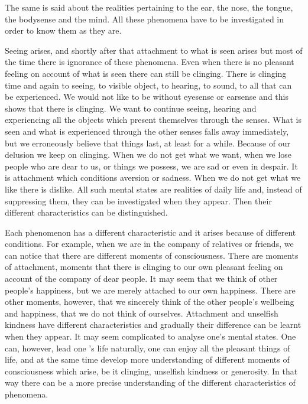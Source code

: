 \documentclass{book}
\begin{document}
The same is said about the realities pertaining to the ear, the nose,
the tongue, the bodysense and the mind. All these phenomena have to be
investigated in order to know them as they are.

Seeing arises, and shortly after that attach­ment to what is
seen arises but most of the time there is ignorance of these phenomena. Even when there is no pleasant feeling on account of what is seen there  can still be clinging. There is clinging time and again to seeing, to
visible object, to hearing, to sound, to all that can be experienced. We
would not like to be without eyesense or earsense and this shows that
there is clinging. We want to continue seeing, hearing and experiencing
all the objects which present themselves through the senses. What is
seen and what is experienced through the other senses falls away
immediately, but we erroneously believe that things last, at least for a
while. Because of our delusion we keep on clinging. When we do not get
what we want, when we lose people who are dear to us, or things we
possess, we are sad or even in despair. It is attachment which
conditions aversion or sadness. When we do not get what we like there is
dislike. All such mental states are realities of daily life and, instead
of suppressing them, they can be investigated when they appear. Then
their different characteristics can be distinguished.

Each phenomenon has a different characteristic and it arises because of
different conditions. For example, when we are in the company of
relatives or friends, we can notice that there are different moments of
consciousness. There are moments of attachment, moments that there is
clinging to our own pleasant feeling on account of the company of dear
people. It may seem that we think of other people's happiness, but we
are merely attached to our own happiness. There are other moments,
however, that we sincerely think of the other people's wellbeing and
happiness, that we do not think of ourselves. Attachment and unselfish
kindness have different characteristics and gradually their difference
can be learnt when they appear. It may seem complicated to analyse one's
mental states. One can, however, lead one 's life naturally, one can
enjoy all the pleasant things of life, and at the same time develop more
understanding of different moments of conscious­ness which arise, be it
clinging, unselfish kindness or generosity. In that way there can be a
more precise under­standing of the different characteristics of
phenomena.
\end{document}
